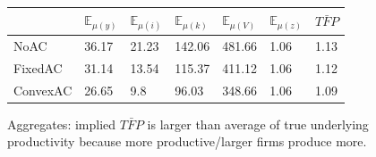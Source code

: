 \documentclass[12pt,english]{article}
\theoremstyle{remark}
\newcommand{\E}{\mathbb{E}}
\begin{document}
	\begin{figure}
			\begin{center}
			\begin{tabular}{ | m{2cm} | m{1cm}| m{1cm} | m{1cm} |m{1cm} |m{1cm} |m{1cm} |} 
				\hline
				& $\E_{\mu(y)}$ & $\E_{\mu(i)}$ & $\E_{\mu(k)}$ & $\E_{\mu(V)}$ & $\E_{\mu(z)}$ & $\bar{TFP}$ \\ 
				\hline
				NoAC & 36.17 & 21.23 & 142.06 & 481.66 & 1.06 & 1.13 \\ 
				\hline
				FixedAC & 31.14 & 13.54 & 115.37 & 411.12 & 1.06 & 1.12 \\ 
				\hline
				ConvexAC & 26.65 & 9.8 & 96.03 & 348.66 & 1.06 & 1.09 \\ 
				\hline
			\end{tabular}
		\end{center}
		\caption{Aggregates: implied $\bar{TFP}$ is larger than average of true underlying productivity because more productive/larger firms produce more.}
	\end{figure}
	\clearpage
\end{document}
